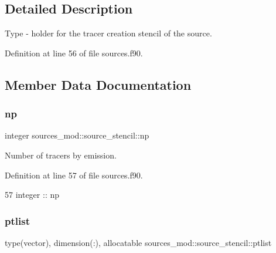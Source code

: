 \subsection{Detailed Description}
Type -\/ holder for the tracer creation stencil of the source. 

Definition at line 56 of file sources.\+f90.



\subsection{Member Data Documentation}
\mbox{\label{structsources__mod_1_1source__stencil_a11ed46a8e923b5902cc02420d88158c5}} 
\subsubsection{\texorpdfstring{np}{np}}
{\footnotesize\ttfamily integer sources\+\_\+mod\+::source\+\_\+stencil\+::np\hspace{0.3cm}{\ttfamily [private]}}



Number of tracers by emission. 



Definition at line 57 of file sources.\+f90.


\begin{DoxyCode}
57         \textcolor{keywordtype}{integer} :: np
\end{DoxyCode}
\mbox{\label{structsources__mod_1_1source__stencil_a154e50e2872650da574d0a1148e3065a}} 
\subsubsection{\texorpdfstring{ptlist}{ptlist}}
{\footnotesize\ttfamily type(vector), dimension(\+:), allocatable sources\+\_\+mod\+::source\+\_\+stencil\+::ptlist\hspace{0.3cm}{\ttfamily [private]}}



